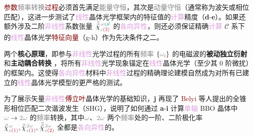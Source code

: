 \textcolor{Maroon}{参数}\textcolor{gray}{频率转换}\textcolor{Maroon}{过程}必须首先满足\textcolor{gray}{能量守恒}，其次是\textcolor{gray}{动量守恒}（通常称为\textcolor{PineGreen}{波矢}或\textcolor{PineGreen}{相位匹配}），这进一步测试了\textcolor{Plum}{线性}\textcolor{PineGreen}{晶体光学}框架内的\textcolor{PineGreen}{特征值}的\textcolor{Plum}{计算}精度（\textbf{d}-\textbf{e}）。如果还额外涉及二阶\textcolor{Plum}{非线性}系数张量 $\Xint{{}^{}_{\mathcolor{gray}{-}}}{23}{\bar{\bar{\bar{\chi}}}}^{\;\! \mathcolor{gray}{\omega} \textcolor{PineGreen}{\imath \jmath l}}_{\mathcolor{gray}{z} \textcolor{Maroon}{(2)}}$ 的\textcolor{Plum}{各向异性}，则还必须保证精确\textcolor{Plum}{计算} \textcolor{PineGreen}{$\mathcal{C}$ 系}下\cite{midwinterEffectsPhaseMatching1965,yaoAccurateCalculationOptimum1992,dmitrievEffectiveNonlinearityCoefficients1993,diesperovEffectiveNonlinearCoefficient1997} 的\textcolor{Plum}{线性}\textcolor{PineGreen}{晶体光学}\textcolor{Maroon}{特征向量}（g-h）作为先决条件之二。

两个\textbf{核心原理}，即参与\textcolor{Plum}{非线性}光学过程的所有\textcolor{gray}{频率} $\{ \mathcolor{gray}{\omega}_{\textcolor{Maroon}{i}} \}$ 的电磁波的\textbf{被动独立衍射}   和\textbf{主动耦合转换}  ，将所有\textcolor{Plum}{非线性}光学现象锚定在\textcolor{Plum}{线性}\textcolor{PineGreen}{晶体光学}（至少其 \textcolor{NavyBlue}{0 阶微扰}）的框架内。这使得\textcolor{Plum}{各向异性}材料中\textcolor{Plum}{非线性}过程的精确\textcolor{NavyBlue}{理论建模}自然成为对所有已建立的\textcolor{Plum}{线性}\textcolor{PineGreen}{晶体光学}模型的更严格的测试。

\clearpage

为了展示矢量\textcolor{Plum}{非线性}\textcolor{Maroon}{傅立叶}\textcolor{PineGreen}{晶体光学}的基础知识，\textbf{j} 再现了 \textcolor{Maroon}{Belyi} 等人\cite{belyiPropagationHighorderCircularly2011}提出的\textcolor{PineGreen}{全锥形相位匹配}二次谐波发生（SHG），说明了如何通过 \textbf{a}-\textbf{i} 计算\textcolor{Plum}{单轴} BBO 晶体中 $\mathcolor{gray}{\omega} \to \mathcolor{gray}{2\omega}$ 的\textcolor{gray}{频率}转换，其中$\mathcolor{gray}{\omega}$、$\mathcolor{gray}{2\omega}$ 两个\textcolor{gray}{频率}处的一阶、二阶极化率 $\bar{\bar{\chi}}^{\;\! \mathcolor{gray}{\omega}}_{\mathcolor{gray}{z} \textcolor{Maroon}{(1)}},\bar{\bar{\chi}}^{\;\! \mathcolor{gray}{2\omega}}_{\mathcolor{gray}{z} \textcolor{Maroon}{(1)}},\Xint{{}^{}_{\mathcolor{gray}{-}}}{23}{\bar{\bar{\bar{\chi}}}}^{\;\! \mathcolor{gray}{2\omega}}_{\mathcolor{gray}{z} \textcolor{Maroon}{(2)}}$ 全都是\textcolor{Plum}{各向异性}的。

